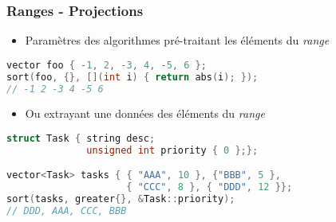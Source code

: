 \documentclass[C++.tex]{subfiles}
\begin{document}
\begin{frame}[fragile]
	\frametitle{Ranges - Projections}
	\begin{itemize}
		\item Paramètres des algorithmes pré-traitant les éléments du \textit{range}
	\end{itemize}

	\begin{lstlisting}[language=C++]
vector foo { -1, 2, -3, 4, -5, 6 };
sort(foo, {}, [](int i) { return abs(i); }); 
// -1 2 -3 4 -5 6\end{lstlisting}


	\begin{itemize}
		\item Ou extrayant une données des éléments du \textit{range}
	\end{itemize}

	\begin{lstlisting}[language=C++]
struct Task { string desc;
              unsigned int priority { 0 };};

vector<Task> tasks { { "AAA", 10 }, {"BBB", 5 }, 
                     { "CCC", 8 }, { "DDD", 12 }};
sort(tasks, greater{}, &Task::priority);
// DDD, AAA, CCC, BBB\end{lstlisting}
\end{frame}
\end{document}
